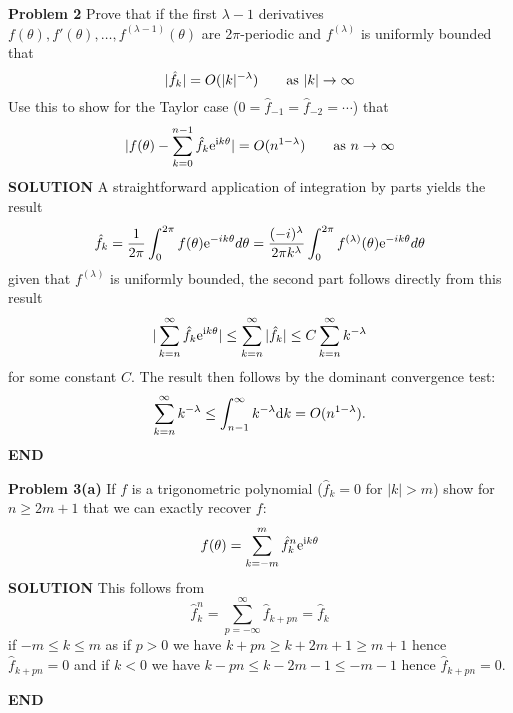 \documentclass[12pt,a4paper]{article}
\begin{document}
\textbf{Problem 2} Prove that if the first $\ensuremath{\lambda}-1$ derivatives $f(\ensuremath{\theta}), f'(\ensuremath{\theta}), \ensuremath{\ldots}, f^{(\ensuremath{\lambda}-1)}(\ensuremath{\theta})$ are 2\ensuremath{\pi}-periodic and $f^{(\ensuremath{\lambda})}$ is uniformly bounded  that
\[
|\hat f_k| = O(|k|^{-\ensuremath{\lambda}})\qquad \hbox{as $|k| \ensuremath{\rightarrow} \ensuremath{\infty}$}
\]
Use this to show for the Taylor case ($0 = \hat f_{-1} = \hat f_{-2} = \ensuremath{\cdots}$) that
\[
|f(\ensuremath{\theta}) - \ensuremath{\sum}_{k=0}^{n-1} \hat f_k {\rm e}^{{\rm i}k\ensuremath{\theta}}| = O(n^{1-\ensuremath{\lambda}})\qquad \hbox{as $n \ensuremath{\rightarrow} \ensuremath{\infty}$}
\]
\textbf{SOLUTION} A straightforward application of integration by parts yields the result
\[
\hat f_k = \frac{1}{2\ensuremath{\pi}} \int^{2\ensuremath{\pi}}_{0} f(\ensuremath{\theta}) {\rm e}^{-ik\ensuremath{\theta}} d\ensuremath{\theta} = \frac{(-i)^\ensuremath{\lambda}}{2\ensuremath{\pi} k^{\ensuremath{\lambda}}} \int^{2\ensuremath{\pi}}_{0} f^{(\ensuremath{\lambda})}(\ensuremath{\theta}) {\rm e}^{-ik\ensuremath{\theta}} d\ensuremath{\theta}
\]
given that $f^{(\ensuremath{\lambda})}$ is uniformly bounded, the second part follows directly from this result
\[
|\ensuremath{\sum}_{k=n}^{\ensuremath{\infty}} \hat f_k {\rm e}^{{\rm i}k\ensuremath{\theta}}| \ensuremath{\leq} \ensuremath{\sum}_{k=n}^{\ensuremath{\infty}} |\hat f_k | \ensuremath{\leq} C \ensuremath{\sum}_{k=n}^{\ensuremath{\infty}} k^{-\ensuremath{\lambda}}
\]
for some constant $C$. The result then follows by the dominant convergence test:
\[
\ensuremath{\sum}_{k=n}^{\ensuremath{\infty}} k^{-\ensuremath{\lambda}} \ensuremath{\leq} \int_{n-1}^\ensuremath{\infty} k^{-\ensuremath{\lambda}} {\rm d}k = O(n^{1-\ensuremath{\lambda}}).
\]
\textbf{END}

\textbf{Problem 3(a)} If $f$ is a trigonometric polynomial  ($\hat f_k = 0$ for $|k| > m$) show for $n \ensuremath{\geq} 2m+1$ that we can exactly recover $f$:
\[
f(\ensuremath{\theta}) = \ensuremath{\sum}_{k=-m}^m \hat f_k^n {\rm e}^{{\rm i} k \ensuremath{\theta}}
\]
\textbf{SOLUTION} This follows from
\[
\hat f_k^n = \ensuremath{\sum}_{p=-\ensuremath{\infty}}^\ensuremath{\infty} \hat f_{k+pn} = \hat f_k
\]
if $-m \ensuremath{\leq} k \ensuremath{\leq} m$ as if $p > 0$ we have $k + p n \ensuremath{\geq} k + 2m+1 \ensuremath{\geq} m+1$ hence $\hat f_{k+pn} = 0$ and if $k < 0$ we have $k - pn \ensuremath{\leq} k -2m-1 \ensuremath{\leq} -m-1$ hence $\hat f_{k+pn} = 0$.

\textbf{END}
\end{document}
